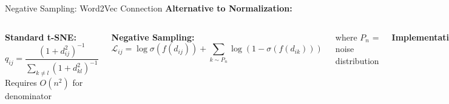 \begin{frame}{Negative Sampling: Word2Vec Connection}
\textbf{Alternative to Normalization:}

\begin{columns}
\textbf{Standard t-SNE:}
$$q_{ij} = \frac{(1 + d_{ij}^2)^{-1}}{\sum_{k \neq l}(1 + d_{kl}^2)^{-1}}$$
Requires $O(n^2)$ for denominator

\textbf{Negative Sampling:}
$$\mathcal{L}_{ij} = \log \sigma(f(d_{ij})) + \sum_{k \sim P_n} \log(1 - \sigma(f(d_{ik})))$$

where $P_n$ = noise distribution

\textbf{Implementation:}
\begin{enumerate}
\item For each edge $(i,j)$
\item Sample $K$ negative points
\item Update via logistic function
\item No normalization needed!
\end{enumerate}

\textbf{Complexity:}
\begin{itemize}
\item Per iteration: $O(|E| \cdot K)$
\item Total: $O(n \cdot k \cdot K \cdot T)$
\end{itemize}

\end{columns}
\end{frame}

